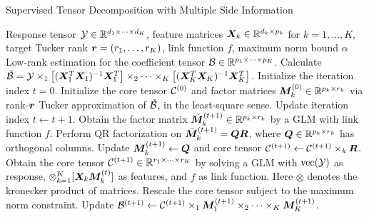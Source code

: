\documentclass[12pt]{article}
\theoremstyle{plain}
\theoremstyle{definition}
\begin{document}
\begin{algorithm}[t]
\caption{Supervised Tensor Decomposition with Multiple Side Information}\label{alg:B}
\begin{algorithmic}[1]
\INPUT Response tensor $\mathcal{Y}\in \mathbb{R}^{d_1\times \cdots \times d_K}$, feature matrices $\bm X_k\in\mathbb{R}^{d_k\times p_k}$ for $k=1,\ldots,K$, target Tucker rank $\bm{r}=(r_1,\ldots,r_K)$, link function $f$, maximum norm bound $\alpha$
\OUTPUT Low-rank estimation for the coefficient tensor $\mathcal{B}\in\mathbb{R}^{p_1\times \cdots\times p_K}$. 
\State Calculate $\check {\mathcal{B}}=\mathcal{Y}\times_1 \left[(\bm X_1^T\bm X_1)^{-1}\bm X^T_1\right] \times_2\cdots\times_K\left[(\bm X_K^T\bm X_K)^{-1}\bm X^T_K\right] $.
\State Initialize the iteration index $t=0$. Initialize the core tensor $\mathcal{C}^{(0)}$ and factor matrices $\bm M^{(0)}_k\in\mathbb{R}^{p_k\times r_k}$ via rank-$\bm{r}$ Tucker approximation of $\check{\mathcal{B}}$, in the least-square sense. 
\State Update iteration index $t \leftarrow t+1$.
\State Obtain the factor matrix $\tilde {\bm M}_k^{(t+1)}\in\mathbb{R}^{p_k\times r_k}$ by a GLM with link function $f$. 
\State Perform QR factorization on $\tilde {\bm M}_k^{(t+1)}=\bm{Q}\bm{R}$, where $\bm{Q}\in\mathbb{R}^{p_k\times r_k}$ has orthogonal columns. 
\State Update $\bm M_k^{(t+1)}\leftarrow \bm{Q}$ and core tensor $\mathcal{C}^{(t+1)}\leftarrow \mathcal{C}^{(t+1)}\times_k \bm{R}$.
\EndFor
\State Obtain the core tensor $\mathcal{C}^{(t+1)}\in\mathbb{R}^{r_1\times\cdots\times r_K}$ by solving a GLM with $\text{vec}(\mathcal{Y})$ as response, $\otimes_{k=1}^K[ \bm X_k\bm M^{(t)}_k]$ as features, and $f$ as link function. Here $\otimes$ denotes the kronecker product of matrices. 
\State Rescale the core tensor subject to the maximum norm constraint. 
\State Update $\mathcal{B}^{(t+1)}\leftarrow \mathcal{C}^{(t+1)}\times_1\bm M_1^{(t+1)}\times_2\cdots\times_K\bm M_K^{(t+1)}$.
\EndWhile
\end{algorithmic}
\end{algorithm}
\end{document}

